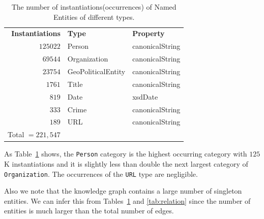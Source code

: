 \documentclass[paper=a4,fontsize=11pt]{scrartcl}
\newcommand{\Tabref}[1]{Table~\ref{#1}}
\numberwithin{equation}{section}    %
\numberwithin{figure}{section}      %
\numberwithin{table}{section}       %
\begin{document}
\begin{table}[htbp]
  \centering
  \begin{tabular}{r l l}
    \textbf{Instantiations} & \textbf{Type}      & \textbf{Property} \\
    $125022$                & Person             & canonicalString   \\
    $69544$                 & Organization       & canonicalString   \\
    $23754$                 & GeoPoliticalEntity & canonicalString   \\
    $1761$                  & Title              & canonicalString   \\
    $819$                   & Date               & xsdDate           \\
    $333$                   & Crime              & canonicalString   \\
    $189$                   & URL                & canonicalString   \\\cline{1-1}
    Total $= 221,547$                                                \\
  \end{tabular}
  \caption{The number of instantiations(occurrences) of Named Entities of different types.}
  \label{tab:type}
\end{table}
As \Tabref{tab:type} shows, the \texttt{Person} category is the highest occurring
category with $125$K instantiations
and it is slightly less than double the next largest category of \texttt{Organization}.
The occurrences of the \texttt{URL} type are negligible.

Also we note that the knowledge graph contains a large number of singleton entities.
We can infer this from Tables~\ref{tab:type} and \ref{tab:relation}
since the number of entities is much larger than the total number of edges.
\end{document}
